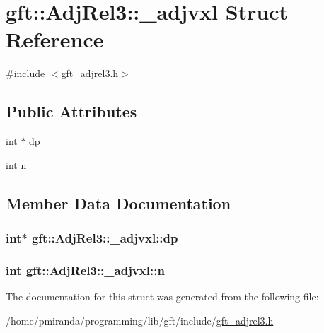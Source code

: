 \hypertarget{structgft_1_1AdjRel3_1_1__adjvxl}{}\section{gft\+:\+:Adj\+Rel3\+:\+:\+\_\+adjvxl Struct Reference}
\label{structgft_1_1AdjRel3_1_1__adjvxl}


{\ttfamily \#include $<$gft\+\_\+adjrel3.\+h$>$}

\subsection*{Public Attributes}
\begin{DoxyCompactItemize}
\item 
int $\ast$ \hyperlink{structgft_1_1AdjRel3_1_1__adjvxl_a7206cf2e7a88b2ea92c7a4fea6f81ade}{dp}
\item 
int \hyperlink{structgft_1_1AdjRel3_1_1__adjvxl_afc39306a67ac29baa74d416e3959db76}{n}
\end{DoxyCompactItemize}


\subsection{Member Data Documentation}
\subsubsection[{\texorpdfstring{dp}{dp}}]{\setlength{\rightskip}{0pt plus 5cm}int$\ast$ gft\+::\+Adj\+Rel3\+::\+\_\+adjvxl\+::dp}\hypertarget{structgft_1_1AdjRel3_1_1__adjvxl_a7206cf2e7a88b2ea92c7a4fea6f81ade}{}\label{structgft_1_1AdjRel3_1_1__adjvxl_a7206cf2e7a88b2ea92c7a4fea6f81ade}
\subsubsection[{\texorpdfstring{n}{n}}]{\setlength{\rightskip}{0pt plus 5cm}int gft\+::\+Adj\+Rel3\+::\+\_\+adjvxl\+::n}\hypertarget{structgft_1_1AdjRel3_1_1__adjvxl_afc39306a67ac29baa74d416e3959db76}{}\label{structgft_1_1AdjRel3_1_1__adjvxl_afc39306a67ac29baa74d416e3959db76}


The documentation for this struct was generated from the following file\+:\begin{DoxyCompactItemize}
\item 
/home/pmiranda/programming/lib/gft/include/\hyperlink{gft__adjrel3_8h}{gft\+\_\+adjrel3.\+h}\end{DoxyCompactItemize}
